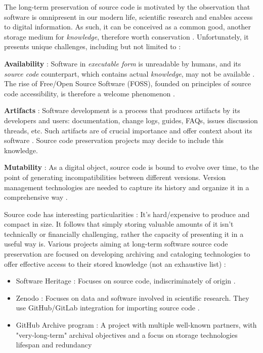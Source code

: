 \documentclass[11pt]{article}
\begin{document}
The long-term preservation of source code is motivated by the observation that software is omnipresent in our modern life, scientific research and enables access to digital information. As such, it can be conceived as a common good, another storage medium for \textit{knowledge}, therefore worth conservation \cite{di2017software}. Unfortunately, it presents unique challenges, including but not limited to :

\textbf{Availability} : Software in \textit{executable form} is unreadable by humans, and its \textit{source code} counterpart, which contains actual \textit{knowledge}, may not be available \cite{di2017software}. The rise of Free/Open Source Software (FOSS), founded on principles of source code accessibility, is therefore a welcome phenomenon \cite{schweik2012internet}.

\textbf{Artifacts} : Software development is a process that produces artifacts by its developers and users: documentation, change logs, guides, FAQs, issues discussion threads, etc. Such artifacts are of crucial importance and offer context about its software \cite{di2017software,corrado2019software}. Source code preservation projects may decide to include this knowledge.

\textbf{Mutability} : As a digital object, source code is bound to evolve over time, to the point of generating incompatibilities between different versions. Version management technologies are needed to capture its history and organize it in a comprehensive way \cite{di2017software,holzmann2016archiving}.


Source code has interesting particularities : It's hard/expensive to produce and compact in size. It follows that simply storing valuable amounts of it isn't technically or financially challenging, rather the capacity of presenting it in a useful way is. Various projects aiming at long-term software source code preservation are focused on developing archiving and cataloging technologies to offer effective access to their stored knowledge (not an exhaustive list) :

\begin{itemize}
	
	\item Software Heritage : Focuses on source code, indiscriminately of origin \cite{di2017software,softheri}.
	
	\item Zenodo : Focuses on data and software involved in scientific research. They use GitHub/GitLab integration for importing source code \cite{zenodo}.
	
	\item GitHub Archive program : A project with multiple well-known partners, with "very-long-term" archival objectives and a focus on storage technologies lifespan and redundancy \cite{githubap}
	
\end{itemize}
\end{document}
